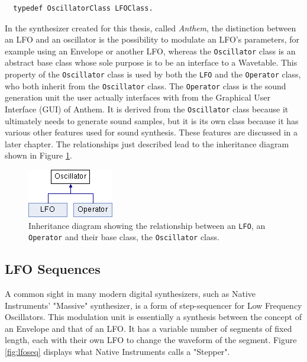\documentclass[12pt,twoside]{report}
\begin{document}
\begin{lstlisting}
  typedef OscillatorClass LFOClass.
\end{lstlisting}

\noindent In the synthesizer created for this thesis, called \emph{Anthem}, the distinction between an LFO and an oscillator is the possibility to modulate an LFO's parameters, for example using an Envelope or another LFO, whereas the \texttt{Oscillator} class is an abstract base class whose sole purpose is to be an interface to a Wavetable. This property of the \texttt{Oscillator} class is used by both the \texttt{LFO} and the \texttt{Operator} class, who both inherit from the \texttt{Oscillator} class. The \texttt{Operator} class is the sound generation unit the user actually interfaces with from the Graphical User Interface (GUI) of Anthem. It is derived from the \texttt{Oscillator} class because it ultimately needs to generate sound samples, but it is its own class because it has various other features used for sound synthesis. These features are discussed in a later chapter. The relationships just described lead to the inheritance diagram shown in Figure \ref{fig:osc-derived}.

\begin{figure}[h!]
  \includegraphics[scale=0.9]{img/osc-derived}
  \caption{Inheritance diagram showing the relationship between an \texttt{LFO}, an \texttt{Operator} and their base class, the \texttt{Oscillator} class.}
  \label{fig:osc-derived}
\end{figure}

\subsection{LFO Sequences}

A common sight in many modern digital synthesizers, such as Native Instruments'\footnotemark{} "Massive" synthesizer, is a form of step-sequencer for Low Frequency Oscillators. This modulation unit is essentially a synthesis between the concept of an Envelope and that of an LFO. It has a variable number of segments of fixed length, each with their own LFO to change the waveform of the segment. Figure \ref{fig:lfoseq} displays what Native Instruments calls a "Stepper".\\
\end{document}
